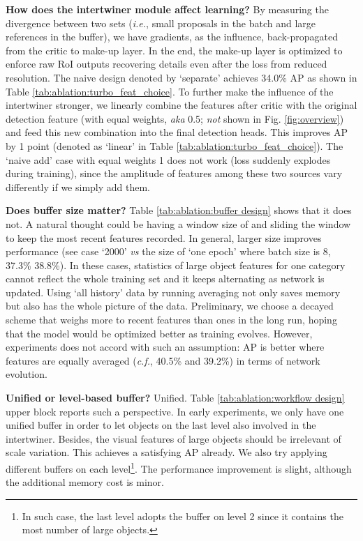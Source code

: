 \documentclass{article} \usepackage{iclr2019_conference,times}
\begin{document}
\textbf{How does the intertwiner module affect learning?} By measuring the  divergence between two sets (\textit{i.e.}, small proposals in the batch and large references in the buffer), we have gradients, as the influence, back-propagated from the critic to make-up layer. In the end, the make-up layer is optimized to enforce raw RoI outputs recovering details even after the loss from reduced resolution. 
The naive design denoted by `separate' achieves 34.0\% AP as shown in Table \ref{tab:ablation:turbo_feat_choice}. 
To further make the influence of the intertwiner stronger, we linearly combine the features after critic with the original detection feature (with equal weights, \textit{aka} 0.5; \textit{not} shown in Fig. \ref{fig:overview}) and feed this new combination into the final detection heads. This improves AP by 1 point (denoted as `linear' in Table \ref{tab:ablation:turbo_feat_choice}). The `naive add' case with equal weights 1 does not work (loss suddenly explodes during training), since the amplitude of features among these two sources vary differently if we simply add them.



\textbf{Does buffer size matter?} Table \ref{tab:ablation:buffer design} shows that it does not. A natural thought could be having a window size of  and sliding the window to keep the most recent features recorded. In general, larger size improves performance (see case `2000' \textit{vs} the size of `one epoch' where batch size is 8, 37.3\%  38.8\%). In these cases,  statistics of large object features for one category cannot reflect the whole training set and it keeps alternating as network is updated. 
Using `all history' data by running averaging not only saves memory  but also has the whole picture of the data. Preliminary, we choose a decayed scheme that weighs more to recent features than ones in the long run, hoping that the model would be optimized better as training evolves. However, experiments does not accord with such an assumption: AP is better where features are equally averaged (\textit{c.f.}, 40.5\% and 39.2\%) in terms of network evolution.


\textbf{Unified or level-based buffer?} Unified. Table \ref{tab:ablation:workflow design} upper block reports such a perspective. In early experiments, we only have one unified buffer in order to let objects on the last level also involved in the intertwiner. Besides, the visual features of large objects should be irrelevant of scale variation. This achieves a satisfying AP already. We also try applying different buffers on each level\footnote{In such case, the last level adopts the buffer on level 2 since it contains the most number of large objects.}. The performance improvement is slight, although the additional memory cost is minor.
\end{document}

